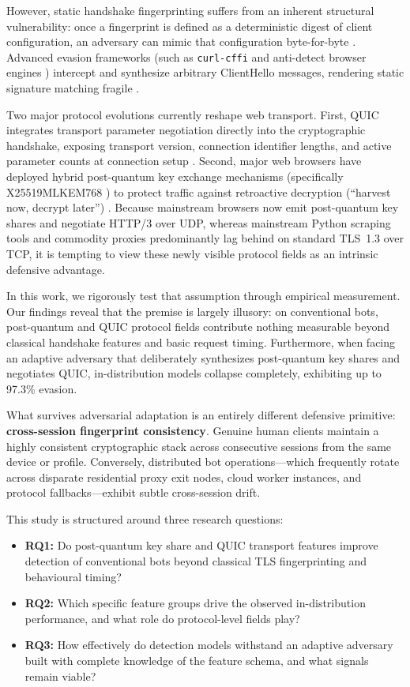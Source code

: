 \documentclass[conference]{IEEEtran}
\begin{document}
However, static handshake fingerprinting suffers from an inherent structural vulnerability: once a fingerprint is defined as a deterministic digest of client configuration, an adversary can mimic that configuration byte-for-byte \cite{vastel2020fp}. Advanced evasion frameworks (such as \texttt{curl-cffi} and anti-detect browser engines \cite{jordan2022synthetic}) intercept and synthesize arbitrary ClientHello messages, rendering static signature matching fragile \cite{biggio2013evasion}.

Two major protocol evolutions currently reshape web transport. First, QUIC \cite{rfc9000} integrates transport parameter negotiation directly into the cryptographic handshake, exposing transport version, connection identifier lengths, and active parameter counts at connection setup \cite{yu2021first, piraux2021observing}. Second, major web browsers have deployed hybrid post-quantum key exchange mechanisms (specifically X25519MLKEM768 \cite{fips203, rfc8446}) to protect traffic against retroactive decryption (``harvest now, decrypt later'') \cite{paquin2020benchmarking, cloudflare2024pq}. Because mainstream browsers now emit post-quantum key shares and negotiate HTTP/3 over UDP, whereas mainstream Python scraping tools and commodity proxies predominantly lag behind on standard TLS~1.3 over TCP, it is tempting to view these newly visible protocol fields as an intrinsic defensive advantage.

In this work, we rigorously test that assumption through empirical measurement. Our findings reveal that the premise is largely illusory: on conventional bots, post-quantum and QUIC protocol fields contribute nothing measurable beyond classical handshake features and basic request timing. Furthermore, when facing an adaptive adversary that deliberately synthesizes post-quantum key shares and negotiates QUIC, in-distribution models collapse completely, exhibiting up to 97.3\% evasion. 

What survives adversarial adaptation is an entirely different defensive primitive: \textbf{cross-session fingerprint consistency}. Genuine human clients maintain a highly consistent cryptographic stack across consecutive sessions from the same device or profile. Conversely, distributed bot operations—which frequently rotate across disparate residential proxy exit nodes, cloud worker instances, and protocol fallbacks—exhibit subtle cross-session drift.

This study is structured around three research questions:
\begin{itemize}
    \item \textbf{RQ1:} Do post-quantum key share and QUIC transport features improve detection of conventional bots beyond classical TLS fingerprinting and behavioural timing?
    \item \textbf{RQ2:} Which specific feature groups drive the observed in-distribution performance, and what role do protocol-level fields play?
    \item \textbf{RQ3:} How effectively do detection models withstand an adaptive adversary built with complete knowledge of the feature schema, and what signals remain viable?
\end{itemize}
\end{document}
